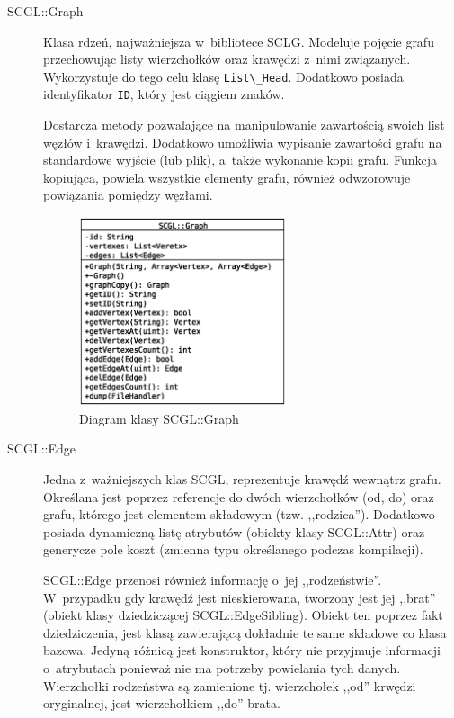 \documentclass[a4paper,12pt,polish,oneside,openright]{thesis}
\newcommand\code[1]{\lstinline[style=line]{#1}}
\begin{document}
\begin{description}
	\item[SCGL::Graph]
	Klasa rdzeń, najważniejsza w~bibliotece SCLG.
	Modeluje pojęcie grafu przechowując listy wierzchołków oraz krawędzi z~nimi związanych.
	Wykorzystuje do tego celu klasę \code{List\_Head}.
	Dodatkowo posiada identyfikator \code{ID}, który jest ciągiem znaków.

	Dostarcza metody pozwalające na manipulowanie zawartością swoich list węzłów i~krawędzi.
	Dodatkowo umożliwia wypisanie zawartości grafu na standardowe wyjście (lub plik), a~także wykonanie kopii grafu.
	Funkcja kopiująca, powiela wszystkie elementy grafu, również odwzorowuje powiązania pomiędzy węzłami.
	\begin{figure}[htb]
	\begin{center}
		\includegraphics[width=0.60\textwidth]{class_graph.eps}
		\caption{Diagram klasy SCGL::Graph}
	\end{center}
	\end{figure}

	\item[SCGL::Edge]
	Jedna z~ważniejszych klas SCGL, reprezentuje krawędź wewnątrz grafu.
	Określana jest poprzez referencje do dwóch wierzchołków (od, do) oraz grafu, którego jest elementem składowym (tzw. ,,rodzica'').
	Dodatkowo posiada dynamiczną listę atrybutów (obiekty klasy SCGL::Attr) oraz generycze pole koszt (zmienna typu określanego podczas kompilacji).

	SCGL::Edge przenosi również informację o~jej ,,rodzeństwie''.
	W~przypadku gdy krawędź jest nieskierowana, tworzony jest jej ,,brat'' (obiekt klasy dziedziczącej SCGL::EdgeSibling).
	Obiekt ten poprzez fakt dziedziczenia, jest klasą zawierającą dokładnie te same składowe co klasa bazowa. Jedyną różnicą jest konstruktor, który nie przyjmuje informacji o~atrybutach ponieważ nie ma potrzeby powielania tych danych.
	Wierzchołki rodzeństwa są zamienione tj. wierzchołek ,,od'' krwędzi oryginalnej, jest wierzchołkiem ,,do'' brata.


\end{description}
\end{document}
